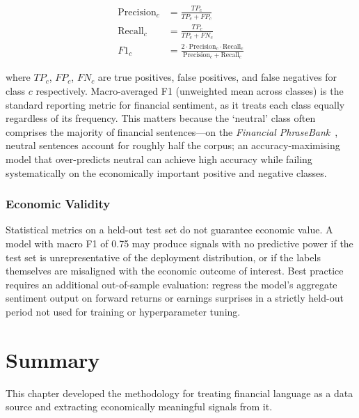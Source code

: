 \begin{align}
  \label{eq:precision-recall}
  \text{Precision}_c &= \frac{TP_c}{TP_c + FP_c} \\
  \text{Recall}_c    &= \frac{TP_c}{TP_c + FN_c} \\
  F1_c               &= \frac{2 \cdot \text{Precision}_c \cdot \text{Recall}_c}{\text{Precision}_c + \text{Recall}_c}
\end{align}

where $TP_c$, $FP_c$, $FN_c$ are true positives, false positives, and false negatives for class $c$ respectively. Macro-averaged F1 (unweighted mean across classes) is the standard reporting metric for financial sentiment, as it treats each class equally regardless of its frequency. This matters because the `neutral' class often comprises the majority of financial sentences---on the \emph{Financial PhraseBank}~\citep{malo2014phrasebank}, neutral sentences account for roughly half the corpus; an accuracy-maximising model that over-predicts neutral can achieve high accuracy while failing systematically on the economically important positive and negative classes.

\subsubsection*{Economic Validity}

Statistical metrics on a held-out test set do not guarantee economic value. A model with macro F1 of 0.75 may produce signals with no predictive power if the test set is unrepresentative of the deployment distribution, or if the labels themselves are misaligned with the economic outcome of interest. Best practice requires an additional out-of-sample evaluation: regress the model's aggregate sentiment output on forward returns or earnings surprises in a strictly held-out period not used for training or hyperparameter tuning.

\section{Summary}
\label{sec:ch09-summary}

This chapter developed the methodology for treating financial language as a data source and extracting economically meaningful signals from it.

